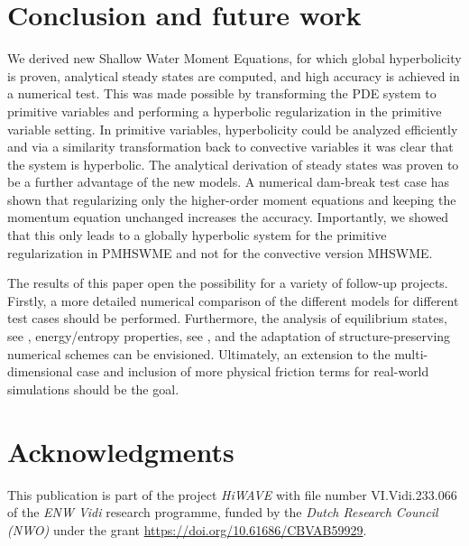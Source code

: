 \documentclass[a4paper, 11pt]{article}
\begin{document}
\section{Conclusion and future work}
We derived new Shallow Water Moment Equations, for which global hyperbolicity is proven, analytical steady states are computed, and high accuracy is achieved in a numerical test. This was made possible by transforming the PDE system to primitive variables and performing a hyperbolic regularization in the primitive variable setting. In primitive variables, hyperbolicity could be analyzed efficiently and via a similarity transformation back to convective variables it was clear that the system is hyperbolic. The analytical derivation of steady states was proven to be a further advantage of the new models. A numerical dam-break test case has shown that regularizing only the higher-order moment equations and keeping the momentum equation unchanged increases the accuracy. Importantly, we showed that this only leads to a globally hyperbolic system for the primitive regularization in PMHSWME and not for the convective version MHSWME.

The results of this paper open the possibility for a variety of follow-up projects. Firstly, a more detailed numerical comparison of the different models for different test cases should be performed. Furthermore, the analysis of equilibrium states, see \cite{Huang2022}, energy/entropy properties, see \cite{Gassner2016}, and the adaptation of structure-preserving numerical schemes \cite{Jin2010} can be envisioned. Ultimately, an extension to the multi-dimensional case and inclusion of more physical friction terms for real-world simulations should be the goal.

\section*{Acknowledgments} \label{section: acknowledgments}
This publication is part of the project \textit{HiWAVE} with file number VI.Vidi.233.066 of the \textit{ENW Vidi} research programme, funded by the \textit{Dutch Research Council (NWO)} under the grant \url{https://doi.org/10.61686/CBVAB59929}.
\end{document}
